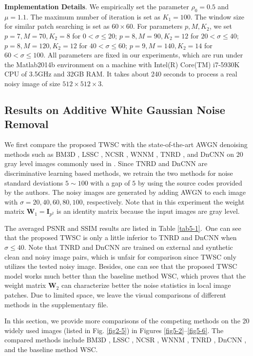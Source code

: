 \textbf{Implementation Details}. We empirically set the parameter $\rho_{0}=0.5$ and $\mu=1.1$. The maximum number of iteration is set as $K_{1}=100$. The window size for similar patch searching is set as $60\times60$. For parameters $p,M,K_{2}$, we set $p=7,M=70,K_{2}=8$ for $0<\sigma\le20$; $p=8,M=90,K_{2}=12$ for $20<\sigma\le40$; $p=8,M=120,K_{2}=12$ for $40<\sigma\le60$; $p=9,M=140,K_{2}=14$ for $60<\sigma\le100$. All parameters are fixed in our experiments, which are run under the Matlab2014b environment on a machine with Intel(R) Core(TM) i7-5930K CPU of 3.5GHz and 32GB RAM. It takes about 240 seconds to process a real noisy image of size $512\times512\times3$.


\subsection{Results on Additive White Gaussian Noise Removal}

We first compare the proposed TWSC with the state-of-the-art AWGN denoising methods such as BM3D \cite{bm3d}, LSSC \cite{lssc}, NCSR \cite{ncsr}, WNNM \cite{wnnm}, TNRD \cite{tnrd}, and DnCNN \cite{dncnn} on 20 gray level images commonly used in \cite{bm3d}. Since TNRD and DnCNN are discriminative learning based methods, we retrain the two methods for noise standard deviations $5\sim100$ with a gap of $5$ by using the source codes provided by the authors. The noisy images are generated by adding AWGN to each image with $\sigma=20,40,60,80,100$, respectively. Note that in this experiment the weight matrix $\bm{W}_{1}=\bm{I}_{p^2}$ is an identity matrix because the input images are gray level.

The averaged PSNR and SSIM \cite{ssim} results are listed in Table \ref{tab5-1}.\ One can see that the proposed TWSC is only a little inferior to TNRD and DnCNN when $\sigma\le40$. Note that TNRD and DnCNN are trained on external and synthetic clean and noisy image pairs, which is unfair for comparison since TWSC only utilizes the tested noisy image. Besides, one can see that the proposed TWSC model works much better than the baseline method WSC, which proves that the weight matrix $\bm{W}_{2}$ can characterize better the noise statistics in local image patches. Due to limited space, we leave the visual comparisons of different methods in the supplementary file.

In this section, we provide more comparisons of the competing methods on the 20 widely used images (listed in Fig. \ref{fig2-5}) in Figures \ref{fig5-2}--\ref{fig5-6}. The compared methods include BM3D \cite{bm3d}, LSSC \cite{lssc}, NCSR \cite{ncsr}, WNNM \cite{wnnm}, TNRD \cite{tnrd}, DnCNN \cite{dncnn}, and the baseline method WSC.
 
